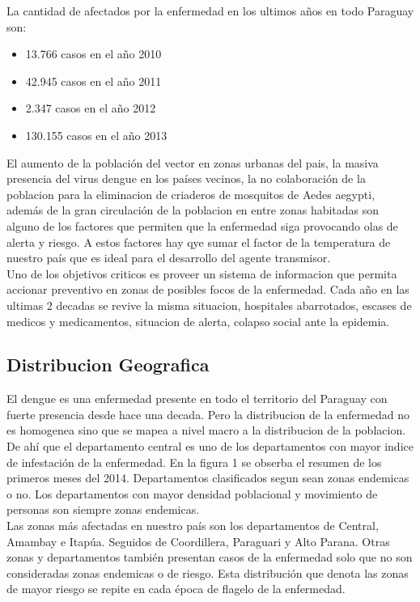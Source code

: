 La cantidad de afectados por la enfermedad en los ultimos años en todo Paraguay son:
\begin{itemize}
\item 13.766 casos en el año 2010
\item 42.945 casos en el año 2011
\item 2.347 casos en el año 2012
\item 130.155 casos en el año 2013\\
\end{itemize}

El aumento de la población del vector en zonas urbanas del pais, la masiva presencia del virus dengue en los países vecinos, la no colaboración de la poblacion para la eliminacion de criaderos de mosquitos de Aedes aegypti, además de la gran circulación de la poblacion en entre zonas habitadas son alguno de los factores que permiten que la enfermedad siga provocando olas de alerta y riesgo. A estos factores hay qye sumar el factor de la temperatura de nuestro país que es ideal para el desarrollo del agente transmisor.\\
 

Uno de los objetivos criticos es proveer un sistema de informacion que permita accionar preventivo en zonas de posibles focos de la enfermedad. Cada año en las ultimas 2 decadas se revive la misma situacion, hospitales abarrotados, escases de medicos y medicamentos, situacion de alerta, colapso social ante la epidemia.\\

\subsection{Distribucion Geografica}

El dengue es una enfermedad presente en todo el territorio del Paraguay con fuerte presencia desde hace una decada. Pero la distribucion de la enfermedad no es homogenea sino que se mapea a nivel macro a la distribucion de la poblacion. De ahí que el departamento central es uno de los departamentos con mayor indice de infestación de la enfermedad. En la figura 1 se obserba el resumen de los primeros meses del 2014. Departamentos clasificados segun sean zonas endemicas o no. Los departamentos con mayor densidad poblacional y movimiento de personas son siempre zonas endemicas.\\

Las zonas más afectadas en nuestro país son los departamentos de Central, Amambay e Itapúa. Seguidos de Coordillera, Paraguari y Alto Parana. Otras zonas y departamentos también presentan casos de la enfermedad solo que no son consideradas zonas endemicas o de riesgo. Esta distribución que denota las zonas de mayor riesgo se repite en cada época de flagelo de la enfermedad.\\ 

